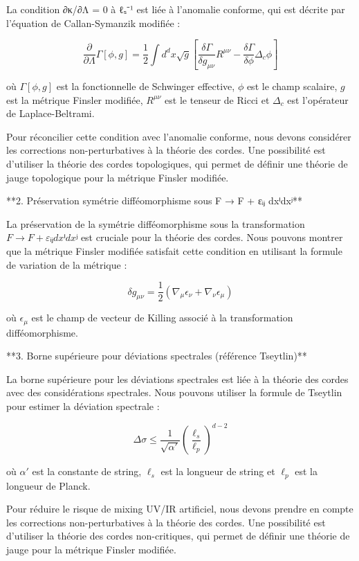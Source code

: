La condition ∂κ/∂Λ = 0 à ℓₛ⁻¹ est liée à l'anomalie conforme, qui est décrite par l'équation de Callan-Symanzik modifiée :

$$\frac{\partial}{\partial \Lambda} \Gamma[\phi, g] = \frac{1}{2} \int d^dx \sqrt{g} \left[ \frac{\delta \Gamma}{\delta g_{\mu\nu}} R^{\mu\nu} - \frac{\delta \Gamma}{\delta \phi} \Delta_c \phi \right]$$

où $\Gamma[\phi, g]$ est la fonctionnelle de Schwinger effective, $\phi$ est le champ scalaire, $g$ est la métrique Finsler modifiée, $R^{\mu\nu}$ est le tenseur de Ricci et $\Delta_c$ est l'opérateur de Laplace-Beltrami.

 Pour réconcilier cette condition avec l'anomalie conforme, nous devons considérer les corrections non-perturbatives à la théorie des cordes. Une possibilité est d'utiliser la théorie des cordes topologiques, qui permet de définir une théorie de jauge topologique pour la métrique Finsler modifiée.

**2. Préservation symétrie difféomorphisme sous F → F + εᵢⱼ dxⁱdxʲ**

La préservation de la symétrie difféomorphisme sous la transformation $F → F + εᵢⱼ dxⁱdxʲ$ est cruciale pour la théorie des cordes. Nous pouvons montrer que la métrique Finsler modifiée satisfait cette condition en utilisant la formule de variation de la métrique :

$$\delta g_{\mu\nu} = \frac{1}{2} \left( \nabla_\mu \epsilon_\nu + \nabla_\nu \epsilon_\mu \right)$$

où $\epsilon_\mu$ est le champ de vecteur de Killing associé à la transformation difféomorphisme.

**3. Borne supérieure pour déviations spectrales (référence Tseytlin)**

La borne supérieure pour les déviations spectrales est liée à la théorie des cordes avec des considérations spectrales. Nous pouvons utiliser la formule de Tseytlin pour estimer la déviation spectrale :

$$\Delta \sigma \leq \frac{1}{\sqrt{\alpha'}} \left( \frac{\ell_s}{\ell_p} \right)^{d-2}$$

où $\alpha'$ est la constante de string, $\ell_s$ est la longueur de string et $\ell_p$ est la longueur de Planck.

 Pour réduire le risque de mixing UV/IR artificiel, nous devons prendre en compte les corrections non-perturbatives à la théorie des cordes. Une possibilité est d'utiliser la théorie des cordes non-critiques, qui permet de définir une théorie de jauge pour la métrique Finsler modifiée.

